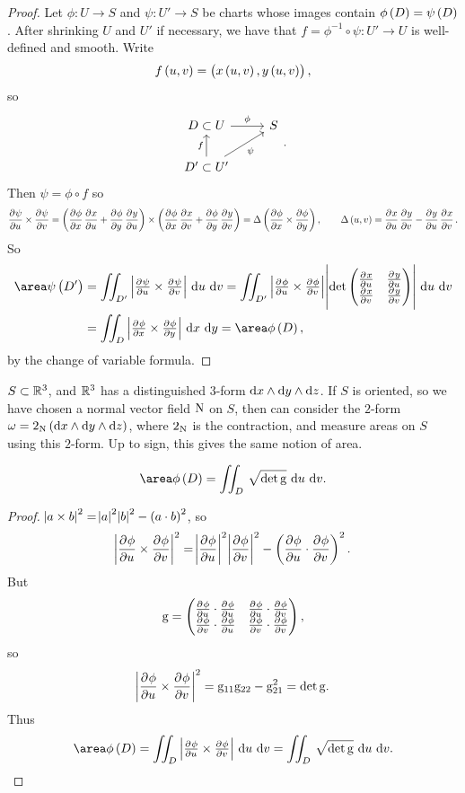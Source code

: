 \begin{proof}
Let $ \phi : U \to S $ and $ \psi : U' \to S $ be charts whose images contain $ \phi\br{D} = \psi\br{D} $. After shrinking $ U $ and $ U' $ if necessary, we have that $ f = \phi^{-1} \circ \psi : U' \to U $ is well-defined and smooth. Write
$$ f\br{u, v} = \br{x\br{u, v}, y\br{u, v}}, $$
so
$$
\begin{tikzcd}
D \subset U \arrow{r}{\phi} & S \\
D' \subset U' \arrow{u}{f} \arrow{ur}[swap]{\psi} &
\end{tikzcd}.
$$
Then $ \psi = \phi \circ f $ so
$$ \dpd{\psi}{u} \times \dpd{\psi}{v} = \br{\dpd{\phi}{x}\dpd{x}{u} + \dpd{\phi}{y}\dpd{y}{u}} \times \br{\dpd{\phi}{x}\dpd{x}{v} + \dpd{\phi}{y}\dpd{y}{v}} = \Delta\br{\dpd{\phi}{x} \times \dpd{\phi}{y}}, \qquad \Delta\br{u, v} = \dpd{x}{u}\dpd{y}{v} - \dpd{y}{u}\dpd{x}{v}. $$
So
\begin{align*}
\area \psi\br{D'}
& = \iintd{D'}{\abs{\tpd{\psi}{u} \times \tpd{\psi}{v}}}{u}{v}
= \iintd{D'}{\abs{\tpd{\phi}{u} \times \tpd{\phi}{v}}\abs{\det \twobytwo{\tpd{x}{u}}{\tpd{y}{u}}{\tpd{x}{v}}{\tpd{y}{v}}}}{u}{v} \\
& = \iintd{D}{\abs{\tpd{\phi}{x} \times \tpd{\phi}{y}}}{x}{y}
= \area \phi\br{D},
\end{align*}
by the change of variable formula.
\end{proof}

\begin{note*}
$ S \subset \mathbb{R}^3 $, and $ \mathbb{R}^3 $ has a distinguished $ 3 $-form $ \mathrm{d} x \wedge \mathrm{d} y \wedge \mathrm{d} z $. If $ S $ is oriented, so we have chosen a normal vector field $ \mathrm{N} $ on $ S $, then can consider the $ 2 $-form $ \omega = 2_\N\br{\d x \wedge \d y \wedge \d z} $, where $ 2_{\mathrm{N}} $ is the contraction, and measure areas on $ S $ using this $ 2 $-form. Up to sign, this gives the same notion of area.
\end{note*}

\pagebreak

\begin{lemma}
$$ \area \phi\br{D} = \iintd{D}{\sqrt{\det \g}}{u}{v}. $$
\end{lemma}

\begin{proof}
$ \abs{a \times b}^2 = \abs{a}^2\abs{b}^2 - \br{a \cdot b}^2 $, so
$$ \abs{\dpd{\phi}{u} \times \dpd{\phi}{v}}^2 = \abs{\dpd{\phi}{u}}^2\abs{\dpd{\phi}{v}}^2 - \br{\dpd{\phi}{u} \cdot \dpd{\phi}{v}}^2. $$
But
$$ \g = \twobytwo{\tpd{\phi}{u} \cdot \tpd{\phi}{u}}{\tpd{\phi}{u} \cdot \tpd{\phi}{v}}{\tpd{\phi}{v} \cdot \tpd{\phi}{u}}{\tpd{\phi}{v} \cdot \tpd{\phi}{v}}, $$
so
$$ \abs{\dpd{\phi}{u} \times \dpd{\phi}{v}}^2 = \g_{11}\g_{22} - \g_{21}^2 = \det \g. $$
Thus
$$ \area \phi\br{D} = \iintd{D}{\abs{\tpd{\phi}{u} \times \tpd{\phi}{v}}}{u}{v} = \iintd{D}{\sqrt{\det \g}}{u}{v}. $$
\end{proof}

